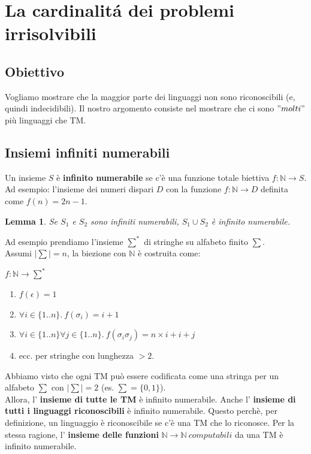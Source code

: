 \documentclass[a4paper, 12pt]{article}
\newtheorem{lemma}[theorem]{Lemma}
\begin{document}
\section{La cardinalit\'a dei problemi irrisolvibili}
\subsection{Obiettivo}
Vogliamo mostrare che la maggior parte dei linguaggi non sono riconoscibili (e, quindi indecidibili). Il nostro argomento consiste nel mostrare che ci sono $"molti"$ pi\`u linguaggi che TM.
\subsection{Insiemi infiniti numerabili}
Un insieme $S$ \`e \textbf{infinito numerabile} se c'\`e una funzione totale biettiva $f: \mathbb{N} \rightarrow S$.
Ad esempio: l'insieme dei numeri dispari $D$ con la funzione $f: \mathbb{N} \rightarrow D$ definita come $f(n) = 2n - 1$.
\begin{lemma}
\label{lemma:1}
Se $S_1$ e $S_2$ sono infiniti numerabili, $S_{1} \cup S_{2}$ \`e infinito numerabile.
\end{lemma}
Ad esempio prendiamo l'insieme $\sum^{*}$ di stringhe su alfabeto finito $\sum$.\\Assumi $|\sum|=n$, la biezione con $\mathbb{N}$ \`e costruita come:
\begin{center}
$f: \mathbb{N} \rightarrow \sum^{*}$
\begin{enumerate}
\item $f(\epsilon) = 1$
\item $\forall i \in \{1..n\}.\ f(\sigma_{i}) = i + 1$
\item $\forall i \in \{1..n\} \forall j \in \{1..n\}.\ f(\sigma_{i} \sigma_{j})= n \times i + i+ j$
\item ecc. per stringhe con lunghezza $> 2$.
\end{enumerate}
\end{center}
Abbiamo visto che ogni TM pu\`o essere codificata come una stringa per un alfabeto $\sum$ con $|\sum| = 2$ (es. $\sum = \{0,1\}$).\\
Allora, l' \textbf{insieme di tutte le TM} \`e infinito numerabile. Anche l' \textbf{insieme di tutti i linguaggi riconoscibili} \`e infinito numerabile. Questo perch\`e, per definizione, un linguaggio \`e riconoscibile se c'\`e una TM che lo riconosce. Per la stessa ragione, l' \textbf{insieme delle funzioni} $\mathbb{N} \rightarrow \mathbb{N}\ computabili$ da una TM \`e infinito numerabile.
\newpage
\end{document}
